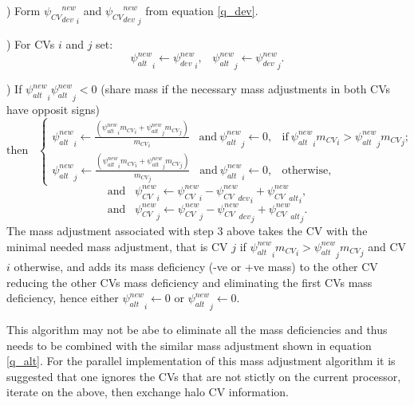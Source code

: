 \par{}) Form ${{\psi_{CV}}^{new}_{dev}}_i$ and ${{\psi_{CV}}^{new}_{dev}}_j$ from equation
\ref{q_dev}.

\par{}) For CVs $i$ and $j$ set:
\begin{equation}
{\psi^{new}_{alt}}_i \leftarrow {\psi^{new}_{dev}}_i, \;\;\;  {\psi^{new}_{alt}}_j \leftarrow {\psi^{new}_{dev}}_j .
\end{equation}

\par{}) If $
{\psi^{new}_{alt}}_i
{\psi^{new}_{alt}}_j  < 0 $ (share mass if the necessary mass adjustments in both CVs have opposit signs)
\begin{equation}
\text{then} \;\;\;
  \begin{cases}
 {\psi^{new}_{alt}}_i \leftarrow \frac{({\psi^{new}_{alt}}_i {m_{CV}}_i+ {\psi^{new}_{alt}}_j {m_{CV}}_j)}{{m_{CV}}_i}
\;\;\;
\text{and} \ {\psi^{new}_{alt}}_j \leftarrow 0
,
& \text{if} \
{{\psi^{new}_{alt}}_i {m_{CV}}_i> {\psi^{new}_{alt}}_j {m_{CV}}_j}
; \\
{\psi^{new}_{alt}}_j \leftarrow\frac{({\psi^{new}_{alt}}_i {m_{CV}}_i+ {\psi^{new}_{alt}}_j {m_{CV}}_j)}{{m_{CV}}_j}
\;\;\;
\text{and} \ {\psi^{new}_{alt}}_i \leftarrow 0,
     &  \text{otherwise},
  \end{cases}
\label{a_ij -alt}
\end{equation}
\begin{equation}
\text{and}\;\;\;
{\psi_{CV}^{new}}_i \leftarrow {\psi_{CV}^{new}}_i - {{\psi_{CV}^{new}}_{dev}}_i + {{\psi_{CV}^{new}}_{alt}}_i,
\end{equation}
\begin{equation}
\text{and}\;\;\;
{\psi_{CV}^{new}}_j \leftarrow {\psi_{CV}^{new}}_j - {{\psi_{CV}^{new}}_{dev}}_j + {{\psi_{CV}^{new}}_{alt}}_j.
\end{equation}
The mass adjustment associated with step 3 above takes the CV with the minimal needed mass adjustment,
that is CV $j$ if ${{\psi^{new}_{alt}}_i {m_{CV}}_i> {\psi^{new}_{alt}}_j {m_{CV}}_j}$ and CV $i$ otherwise,
and adds its mass deficiency (-ve or +ve mass) to the other CV reducing the other CVs mass deficiency and
eliminating the first CVs mass deficiency, hence
either ${\psi^{new}_{alt}}_i \leftarrow 0$  or ${\psi^{new}_{alt}}_j \leftarrow 0$.

This algorithm may not be abe to eliminate all the mass deficiencies and
thus needs to be combined with the
similar mass adjustment shown in equation \ref{q_alt}.
For the parallel implementation of this mass adjustment algorithm it is suggested that
one ignores the CVs that are not stictly on the current processor, iterate on the above, then exchange halo CV information.


